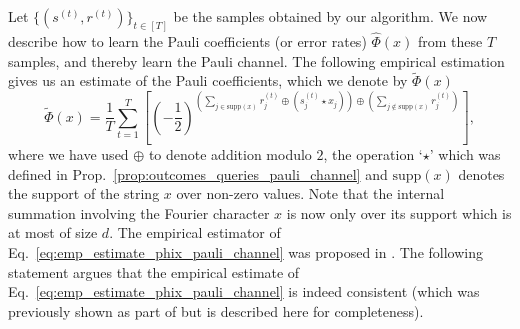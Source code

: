 \documentclass[11pt]{article}
\theoremstyle{plain}
\theoremstyle{plain}
\theoremstyle{definition}
\theoremstyle{remark}
\theoremstyle{named}
\begin{document}
Let $\{(s^{(t)}, r^{(t)})\}_{t \in [T]}$ be the samples obtained by our algorithm. We now describe how to learn the Pauli coefficients (or error rates) $\widehat{\Phi}(x)$ from these $T$ samples, and thereby learn the Pauli channel. The following empirical estimation gives us an estimate of the Pauli coefficients, which we denote by $\widetilde{\Phi}(x)$
\begin{equation}
    \widetilde{\Phi}(x) = \frac{1}{T} \sum_{t=1}^T \left[ \left(- \frac{1}{2}\right)^{\left(\sum \limits_{j \in \text{supp}(x)} r^{(t)}_j \oplus ({s^{(t)}_j} \star x_j) \right) \oplus \left(\sum \limits_{j \notin \text{supp}(x)} r^{(t)}_j \right) } \right],
    \label{eq:emp_estimate_phix_pauli_channel}
\end{equation}
where we have used $\oplus$ to denote addition modulo $2$, the operation `$\star$' which was defined in Prop.~\ref{prop:outcomes_queries_pauli_channel} and $\text{supp}(x)$ denotes the support of the string $x$ over non-zero values. Note that the internal summation involving the Fourier character $x$ is now only over its support which is at most of size $d$. The empirical estimator of Eq.~\ref{eq:emp_estimate_phix_pauli_channel} was proposed in \cite{flammia2021pauli}. The following statement argues that the empirical estimate of Eq.~\ref{eq:emp_estimate_phix_pauli_channel} is indeed consistent (which was previously shown as part of \cite[Theorem 22]{flammia2021pauli} but is described here for completeness).
\end{document}
